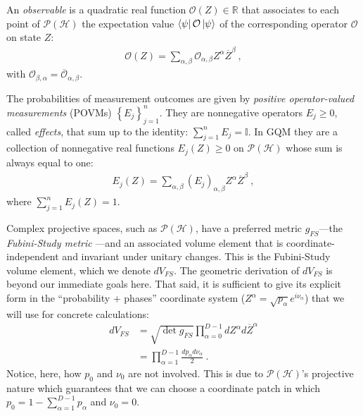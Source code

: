 \documentclass[draft,nofootinbib,prl,twocolumn,showpacs,showkeys,groupaddress,preprintnumbers,floatfix]{revtex4-1}
\newcommand{\1}{\mathbbm{1}}
\begin{document}
An \emph{observable} is a
quadratic real function $\mathcal{O}(Z) \in \mathbb{R}$ that associates to each
point of $\mathcal{P}(\mathcal{H})$ the expectation value $\bra{\psi}
\mathcal{O} \ket{\psi}$ of the corresponding operator $\mathcal{O}$ on
state $Z$:
\begin{align}
\mathcal{O}(Z) = \sum_{\alpha,\beta} \mathcal{O}_{\alpha,\beta}Z^\alpha \overline{Z}^\beta
  ~,
\label{eq:GQM_Observable}
\end{align}
with $\mathcal{O}_{\beta,\alpha} = \overline{\mathcal{O}}_{\alpha,\beta}$.

The probabilities of measurement outcomes are given by \emph{positive
operator-valued measurements} (POVMs) $\left\{E_j\right\}_{j=1}^n$. They are
nonnegative operators $E_j\geq 0$, called \emph{effects}, that sum up to the
identity: $\sum_{j=1}^n E_j = \mathbb{I}$. In GQM they are a collection of
nonnegative real functions $E_j(Z)\ge 0$ on $\mathcal{P}(\mathcal{H})$ whose
sum is always equal to one:
\begin{align}
E_j(Z) = \sum_{\alpha,\beta}
  \left(E_j\right)_{\alpha,\beta} Z^\alpha \overline{Z}^\beta
  ~,
\label{eq:GQM_POVMs}
\end{align}
where $\sum_{j=1}^{n}E_j(Z) = 1$.

Complex projective spaces, such as $\mathcal{P}(\mathcal{H})$, have a preferred
metric $g_{FS}$---the \emph{Fubini-Study metric} \cite{Bengtsson2017}---and an
associated volume element that is coordinate-independent and invariant under
unitary changes. This is the Fubini-Study volume element, which we denote
$dV_{FS}$. The geometric derivation of $dV_{FS}$ is beyond our immediate goals
here. That said, it is sufficient to give its explicit form in the
``probability + phases'' coordinate system ($Z^{\alpha} =
\sqrt{p_\alpha}e^{i\nu_\alpha}$) that we will use for concrete calculations:
\begin{align*}
dV_{FS} & = \sqrt{\det g_{FS}}
  \prod_{\alpha=0}^{D-1} dZ^\alpha d\overline{Z}^\alpha \\
  & =  \prod_{\alpha=1}^{D-1} \frac{dp_\alpha d\nu_\alpha}{2}
  ~.
\end{align*}
Notice, here, how $p_0$ and $\nu_0$ are not involved. This is due to
$\mathcal{P}(\mathcal{H})$'s projective nature which guarantees that we can
choose a coordinate patch in which $p_0 = 1 - \sum_{\alpha=1}^{D-1}p_\alpha$
and $\nu_0 = 0$.
\end{document}
